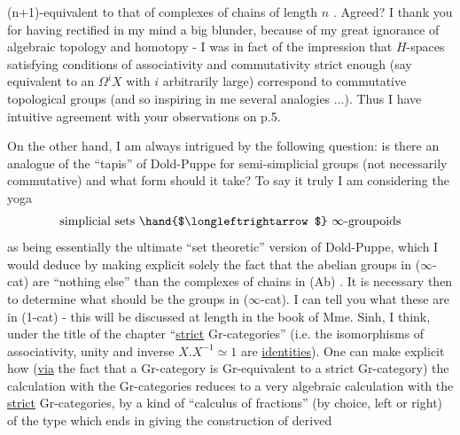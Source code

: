 
(n+1)-equivalent to that of complexes of chains of length $n$ .
Agreed?  I thank you for having rectified in my mind a big blunder,
because of my great ignorance of algebraic topology and homotopy -
I was in fact of the impression that $H$-spaces satisfying conditions
of associativity and commutativity strict enough (say equivalent
to an $\Omega^{i}X$ with $i$ arbitrarily large) correspond to commutative
topological groups (and so inspiring in me several analogies ...).
Thus I have intuitive agreement with your observations on p.5.

On the other hand, I am always intrigued by the following
question: is there an analogue of the ``tapis'' of Dold-Puppe for
semi-simplicial groups (not necessarily commutative) and what form
should it take?  To say it truly I am considering the yoga
\[ \text{simplicial sets } \hand{$\longleftrightarrow$} \ \infty\text{-groupoids} \]
as being essentially the ultimate ``set theoretic'' version of
Dold-Puppe, which I would deduce by making explicit solely the
fact that the abelian groups in  ($\infty$-cat) are ``nothing else'' than
the complexes of chains in  (Ab) .  It is necessary then to
determine what should be the groups in ($\infty$-cat). I can tell you what
these are in (1-cat) - this will be discussed at length in the book
of Mme. Sinh, I think, under the title of the chapter ``\uline{strict}
Gr-categories'' (i.e. the isomorphisms of associativity, unity and
inverse  $X.X^{-1} \simeq 1$  are \uline{identities}).  One can make explicit how
(\uline{via} the fact that a Gr-category is Gr-equivalent to a strict
Gr-category)      the calculation with the Gr-categories reduces
to a very algebraic calculation with the \uline{strict} Gr-categories,
by a kind of ``calculus of fractions'' (by choice, left or right)
of the type which ends in giving the construction of derived

